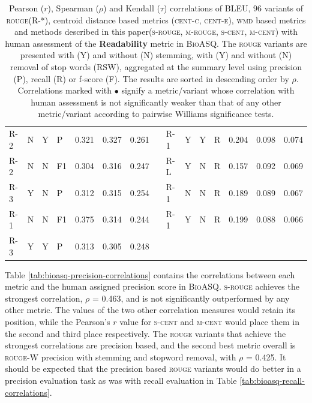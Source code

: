 \documentclass[11pt,a4paper]{article}
\newcommand{\rouge}{\textsc{rouge}\xspace}
\newcommand{\centc}{\textsc{cent-c}\xspace}
\newcommand{\cente}{\textsc{cent-e}\xspace}
\newcommand{\wmd}{\textsc{wmd}\xspace}
\newcommand{\bioasq}{\textsc{BioASQ}\xspace}
\newcommand{\srouge}{\textsc{s-rouge}\xspace}
\newcommand{\mrouge}{\textsc{m-rouge}\xspace}
\newcommand{\scent}{\textsc{s-cent}\xspace}
\newcommand{\mcent}{\textsc{m-cent}\xspace}
\begin{document}
\begin{table}[]
{\begin{tabular}{lllllllllllllll}
\textsc{R-2} & N & Y & P & 0.321 & 0.327 & 0.261 &  & \textsc{R-1} & Y & Y & R & 0.204 & 0.098 & 0.074 \\
\textsc{R-2} & N & N & F1 & 0.304 & 0.316 & 0.247 &  & \textsc{R-L} & Y & N & R & 0.157 & 0.092 & 0.069 \\
\textsc{R-3} & Y & N & P & 0.312 & 0.315 & 0.254 &  & \textsc{R-1} & N & N & R & 0.189 & 0.089 & 0.067 \\
\textsc{R-1} & N & N & F1 & 0.375 & 0.314 & 0.244 &  & \textsc{R-1} & Y & N & R & 0.199 & 0.088 & 0.066 \\
\textsc{R-3} & Y & Y & P & 0.313 & 0.305 & 0.248 &  &  &  &  &  &  &  &  \\ \hline
\end{tabular}
}
\caption{Pearson ($r$), Spearman ($\rho$) and Kendall ($\tau$) correlations of BLEU, 96 variants 
of \rouge (R-*), centroid distance based metrics (\centc, \cente), \wmd based metrics and 
methods described in this paper(\srouge, \mrouge, \scent, \mcent) with human assessment of the \textbf{Readability} metric in \bioasq. The \rouge 
variants are presented with (Y) and without (N) stemming, with (Y) and without (N) removal of 
stop words (RSW), aggregated at the summary level using precision (P), recall (R) or f-score (F).
The results are sorted in descending order by $\rho$. Correlations marked with $\bullet$ signify 
a metric/variant whose correlation with human assessment is not significantly weaker than that 
of any other metric/variant according to pairwise Williams significance tests.}
\label{tab:bioasq-readability-correlations}
\end{table}

Table \ref{tab:bioasq-precision-correlations} contains the correlations between each metric and 
the human assigned precision score in \bioasq. \srouge achieves the strongest correlation, $\rho$ = 0.463, 
and is not significantly outperformed by any other metric. The values of the two other 
correlation measures would retain its position, while the Pearson's $r$ value for \scent 
and \mcent would place them in the second and third place respectively. The \rouge variants 
that achieve the strongest correlations are precision based, and the second best metric overall 
is \rouge-W precision with stemming and stopword removal, with $\rho$ = 0.425. It should be 
expected that the precision based \rouge variants would do better in a precision evaluation 
task as was with recall evaluation in Table \ref{tab:bioasq-recall-correlations}.
\end{document}
